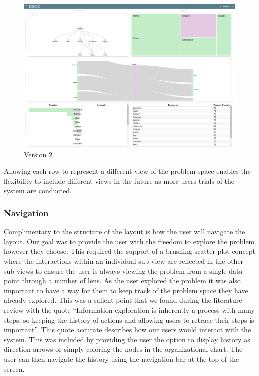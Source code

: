 \message{ !name(FinalPaper.tex)}\documentclass[journal]{vgtc}                %
\begin{document}
\begin{figure}
	\centering
	\includegraphics[width=\columnwidth]{pictures/version2.jpg}
	\caption{Version 2}
	\label{fig:global}
\end{figure}

Allowing each row to represent a different view of the problem space enables the flexibility to include different views in the future as more users trials of the system are conducted.

\subsubsection{Navigation}
Complimentary to the structure of the layout is how the user will navigate the layout.  Our goal was to provide the user with the freedom to explore the problem however they choose.  This required the support of a brushing scatter plot concept where the interactions within an individual sub view are reflected in the other sub views to ensure the user is always viewing the problem from a single data point through a number of lens.
As the user explored the problem it was also important to have a way for them to keep track of the problem space they have already explored.  This was a salient point that we found during the literature review with the quote “Information exploration is inherently a process with many steps, so keeping the history of actions and allowing users to retrace their steps is important”\cite{anafigueiras}.  This quote accurate describes how our users would interact with the system.  This was included by providing the user the option to display history as direction arrows or simply coloring the nodes in the organizational chart.  The user can then navigate the history using the navigation bar at the top of the screen.
\end{document}
